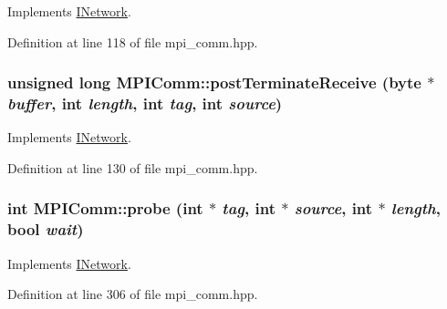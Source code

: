Implements \hyperlink{class_i_network_a60a1f567df811d09fc1774bc439ea349}{INetwork}.

Definition at line 118 of file mpi\_\-comm.hpp.\hypertarget{class_m_p_i_comm_a15aa65ec7dcb1da5fa042fd6d98f1578}{
\subsubsection[{postTerminateReceive}]{\setlength{\rightskip}{0pt plus 5cm}unsigned long MPIComm::postTerminateReceive ({\bf byte} $\ast$ {\em buffer}, \/  int {\em length}, \/  int {\em tag}, \/  int {\em source})}}
\label{class_m_p_i_comm_a15aa65ec7dcb1da5fa042fd6d98f1578}


Implements \hyperlink{class_i_network_ae8381635a24542ac374056c15613daeb}{INetwork}.

Definition at line 130 of file mpi\_\-comm.hpp.\hypertarget{class_m_p_i_comm_a1c1a72b9cf6cac8a5af0e8dc6a085c87}{
\subsubsection[{probe}]{\setlength{\rightskip}{0pt plus 5cm}int MPIComm::probe (int $\ast$ {\em tag}, \/  int $\ast$ {\em source}, \/  int $\ast$ {\em length}, \/  bool {\em wait})}}
\label{class_m_p_i_comm_a1c1a72b9cf6cac8a5af0e8dc6a085c87}


Implements \hyperlink{class_i_network_ab653bd28450c18a74826d06069ed3ed1}{INetwork}.

Definition at line 306 of file mpi\_\-comm.hpp.

